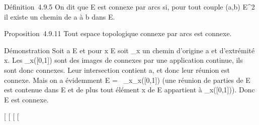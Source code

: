 \documentclass[]{article}
\begin{document}
Définition~4.9.5 On dit que E est connexe par arcs si, pour tout couple
(a,b) \in E^2 il existe un chemin de a à b dans E.

Proposition~4.9.11 Tout espace topologique connexe par arcs est connexe.

Démonstration Soit a \in E et pour x \in E soit \gamma_x un chemin
d'origine a et d'extrémité x. Les \gamma_x({[}0,1{]}) sont des
images de connexes par une application continue, ils sont donc connexes.
Leur intersection contient a, et donc leur réunion est connexe. Mais on
a évidemment E =\ \⋃
 _x\inE\gamma_x({[}0,1{]}) (une réunion de parties de E est
contenue dans E et de plus tout élément x de E appartient à
\gamma_x({[}0,1{]})). Donc E est connexe.

{[}
{[}
{[}
{[}
\end{document}
